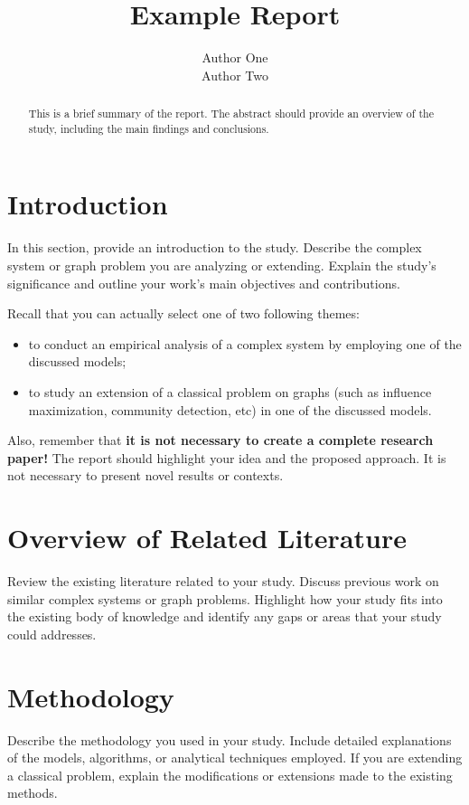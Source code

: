 \documentclass[a4paper,11pt]{article}
\title{Example Report}
\author{Author One \\ Author Two}
\date{}
\begin{document}
\maketitle

\begin{abstract}
This is a brief summary of the report. The abstract should provide an overview of the study, including the main findings and conclusions.
\end{abstract}

\section{Introduction}
In this section, provide an introduction to the study. Describe the complex system or graph problem you are analyzing or extending. Explain the study's significance and outline your work's main objectives and contributions.

Recall that you can actually select one of two following themes:
\begin{itemize}
    \item to conduct an empirical analysis of a complex system by employing one of the discussed models;
    \item to study an extension of a classical problem on graphs (such as influence maximization, community detection, etc) in one of the discussed models.
\end{itemize}

Also, remember that \textbf{it is not necessary to create a complete research paper!} The report should highlight your idea and the proposed approach. It is not necessary to present novel results or contexts.

\section{Overview of Related Literature}
Review the existing literature related to your study. Discuss previous work on similar complex systems or graph problems. Highlight how your study fits into the existing body of knowledge and identify any gaps or areas that your study could addresses.

\section{Methodology}
Describe the methodology you used in your study. Include detailed explanations of the models, algorithms, or analytical techniques employed. If you are extending a classical problem, explain the modifications or extensions made to the existing methods.
\end{document}
